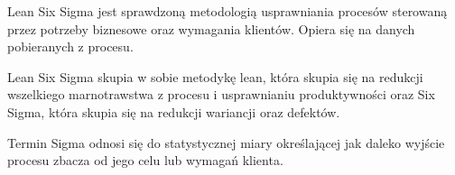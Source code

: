 Lean Six Sigma jest sprawdzoną metodologią usprawniania procesów
sterowaną przez potrzeby biznesowe oraz wymagania klientów.
Opiera się na danych pobieranych z procesu.

Lean Six Sigma skupia w sobie metodykę lean, która skupia się na redukcji wszelkiego
marnotrawstwa z procesu i usprawnianiu produktywności oraz Six Sigma, która skupia się 
na redukcji wariancji oraz defektów.

Termin Sigma odnosi się do statystycznej miary określającej jak daleko wyjście procesu zbacza
od jego celu  lub wymagań klienta.